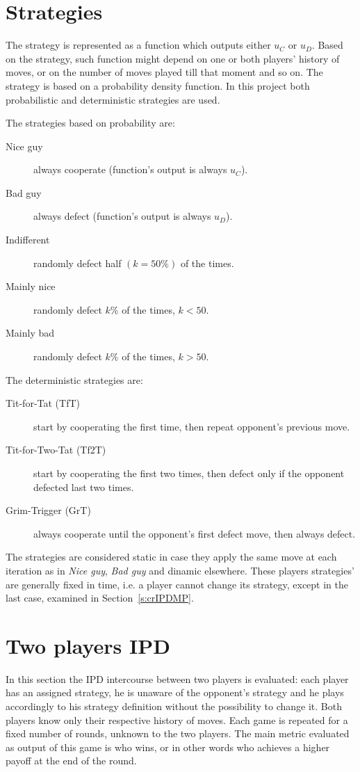 \documentclass[journal,a4paper,10pt,twoside]{IEEEtran} %
\begin{document}
\section{Strategies} \label{s:str}
The strategy is represented as a function which outputs either $u_C$ or $u_D$. Based on the strategy, such function might depend on one or both players' history of moves, or on the number of moves played till that moment and so on.
The strategy is based on a probability density function. In this project both probabilistic and deterministic strategies are used.

The strategies based on probability are:

\begin{description}
    \item[Nice guy] always cooperate (function's output is always $u_C$).
    \item[Bad guy] always defect (function's output is always $u_D$).
    \item[Indifferent] randomly defect half $(k=50\%)$ of the times.
    \item[Mainly nice] randomly defect $k\%$ of the times, $k<50$.%
    \item[Mainly bad] randomly defect $k\%$ of the times, $k>50$.%
\end{description}

The deterministic strategies are:
\begin{description}
    \item[Tit-for-Tat (TfT)] start by cooperating the first time, then repeat opponent's previous move.
    \item[Tit-for-Two-Tat (Tf2T)] start by cooperating the first two times, then defect only if the opponent defected last two times.
    \item[Grim-Trigger (GrT)] always cooperate until the opponent's first defect move, then always defect. 
\end{description}

The strategies are considered static in case they apply the same move at each iteration as in \textit{Nice guy}, \textit{Bad guy} and dinamic elsewhere.
These players strategies' are generally fixed in time, i.e. a player cannot change its strategy, except in the last case, examined in Section~\ref{s:crIPDMP}.

\section{Two players IPD} \label{s:IPD2P}
In this section the IPD intercourse between two players is evaluated: each player has an assigned strategy, he is unaware of the opponent's strategy and he plays accordingly to his strategy definition without the possibility to change it. Both players know only their respective history of moves. Each game is repeated for a fixed number of rounds, unknown to the two players. The main metric evaluated as output of this game is who wins, or in other words who achieves a higher payoff at the end of the round.
\end{document}
